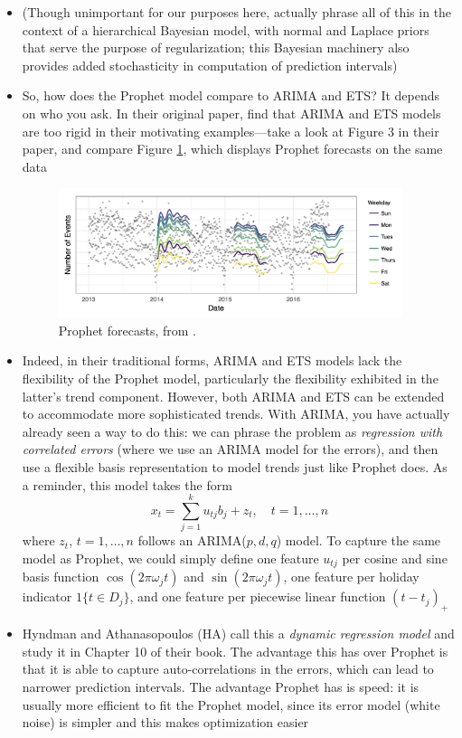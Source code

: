 \documentclass{article}
\begin{document}
\begin{itemize}
\item (Though unimportant for our purposes here, \citet{taylor2018forecasting}
  actually phrase all of this in the context of a hierarchical Bayesian model,
  with normal and Laplace priors that serve the purpose of regularization;  
  this Bayesian machinery also provides added stochasticity in computation of 
  prediction intervals) 

\item So, how does the Prophet model compare to ARIMA and ETS? It depends on who
  you ask. In their original paper, \citet{taylor2018forecasting} find that
  ARIMA and ETS models are too rigid in their motivating examples---take a look
  at Figure 3 in their paper, and compare Figure \ref{fig:prophet}, which
  displays Prophet forecasts on the same data

\begin{figure}[htb]
\centering
\includegraphics[width=0.95\textwidth]{prophet.png}
\caption{Prophet forecasts, from \citet{taylor2018forecasting}.}
\label{fig:prophet}
\end{figure}

\item Indeed, in their traditional forms, ARIMA and ETS models lack the
  flexibility of the Prophet model, particularly the flexibility exhibited in
  the latter's trend component. However, both ARIMA and ETS can be extended to
  accommodate more sophisticated trends. With ARIMA, you have actually already
  seen a way to do this: we can phrase the problem as \emph{regression with
    correlated errors} (where we use an ARIMA model for the errors), and then
  use a flexible basis representation to model trends just like Prophet does. As
  a reminder, this model takes the form     
 \[
  x_t = \sum_{j=1}^k u_{tj} b_j + z_t, \quad t = 1,\dots,n
  \]
  where $z_t$, $t = 1,\dots,n$ follows an ARIMA($p,d,q$) model. To capture the
  same model as Prophet, we could simply define one feature $u_{tj}$ per cosine
  and sine basis function $\cos(2\pi \omega_j t)$ and $\sin(2\pi \omega_j t)$,
  one feature per holiday indicator $1\{ t \in D_j\}$, and one feature per
  piecewise linear function $(t-t_j)_+$  

\item Hyndman and Athanasopoulos (HA) call this a \emph{dynamic regression
    model} and study it in Chapter 10 of their book. The advantage this has over 
  Prophet is that it is able to capture auto-correlations in the errors, which
  can lead to narrower prediction intervals. The advantage Prophet has is speed:
  it is usually more efficient to fit the Prophet model, since its error model
  (white noise) is simpler and this makes optimization easier 
\end{itemize}
\end{document}
